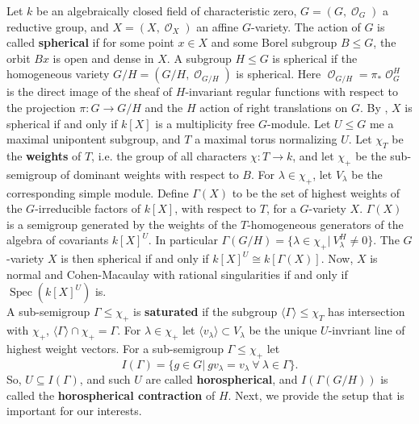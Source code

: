 \documentclass[11pt,oneside]{amsbook}
\numberwithin{equation}{section}
\theoremstyle{plain}
\theoremstyle{definition}
\theoremstyle{remark}
\DeclareMathOperator{\sO}{\mathcal{O}}
\DeclareMathOperator{\Spec}{\mathrm{Spec}}
\newcommand{\la}{\langle}
\newcommand{\ra}{\rangle}
\begin{document}
					Let $k$ be an algebraically closed field of characteristic zero, $G=(G,\sO_G)$ a reductive group, and $X=(X, 
					\sO_X)$ 
					an affine $G$-variety. The action of $G$ is called \textbf{spherical} if for some point $x \in X$ and some Borel 
					subgroup $B \leq G$, the orbit $Bx$ is open and dense in $X$. A subgroup $H \leq G$ is spherical if the 
					homogeneous variety $G/H = (G/H,\sO_{G/H})$ is spherical. Here $\sO_{G/H}=\pi_*\sO_G^H$ is the direct image 
					of the sheaf of $H$-invariant regular functions with respect to the projection $\pi:G \to G/H$ and the $H$ action of 
					right translations on $G$.  By \cite{VK}, $X$ is spherical if and only if $k[X]$ is a multiplicity free $G$-module. Let 
					$U \leq G$ me a maximal unipontent subgroup, and $T$ a maximal torus normalizing $U$. Let $\chi_T$ be the 
					\textbf{weights} of $T$, i.e. the group of all characters $\chi:T \to k$, and let $\chi_+$ be the sub-semigroup of 
					dominant weights with respect to $B$. For $\lambda \in \chi_+$, let $V_{\lambda}$ be the corresponding simple 
					module. Define $\Gamma(X)$ to be the set of highest weights of the $G$-irreducible factors of $k[X]$, with respect 
					to $T$, for a $G$-variety $X$. $\Gamma(X)$ is a semigroup generated by the weights of the $T$-homogeneous 
					generators of the algebra of covariants $k[X]^U$. In particular $\Gamma(G/H) = \{\lambda \in \chi_+| \ 
					V_{\lambda}^H \neq 0\}$. The $G$-variety $X$ is then spherical if and only if $k[X]^U \cong k[\Gamma(X)]$. Now, 
					$X$ is normal and Cohen-Macaulay with rational singularities if and only if $\Spec(k[X]^U)$ is.\\
					A sub-semigroup $\Gamma \leq \chi_+$ is \textbf{saturated} if the subgroup $\la \Gamma \ra \leq \chi_T$ has intersection with $\chi_+$, $\la \Gamma \ra \cap \chi_+ = \Gamma$. For $\lambda \in \chi_+$ let $\la v_{\lambda} \ra \subset V_{\lambda}$ be the unique $U$-invriant line of highest weight vectors. For a sub-semigroup $\Gamma \leq \chi_+$ let
					\[ I(\Gamma) = \{g \in G|\ gv_{\lambda} = v_{\lambda} \ \forall \ \lambda \in \Gamma\} .\]
					So, $U \subseteq I(\Gamma)$, and such $U$ are called \textbf{horospherical}, and $I(\Gamma(G/H))$ is called the \textbf{horospherical contraction} of $H$. Next, we provide the setup that is important for our interests. 
					
\end{document}
